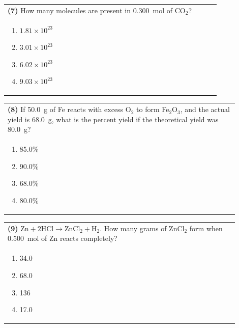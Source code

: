 \documentclass{article}
\begin{document}
{{\vspace{0.2cm}
\noindent\begin{tabular}{|p{0.9\linewidth}|}
\hline
\textbf{(7)} How many molecules are present in 0.300~mol of CO$_2$?\\[0.2cm]

\begin{minipage}[t]{0.85\linewidth}
\begin{enumerate}[label=\alph*.]
\item $1.81\times10^{23}$
\item $3.01\times10^{23}$
\item $6.02\times10^{23}$
\item $9.03\times10^{23}$
\end{enumerate}
\end{minipage}\\[0.2cm]
\hline
\end{tabular}

\vspace{0.2cm}
\noindent\begin{tabular}{|p{0.9\linewidth}|}
\hline
\textbf{(8)} If 50.0~g of Fe reacts with excess O$_2$ to form Fe$_2$O$_3$, and the actual yield is 68.0~g, what is the percent yield if the theoretical yield was 80.0~g?\\[0.2cm]

\begin{minipage}[t]{0.85\linewidth}
\begin{enumerate}[label=\alph*.]
\item 85.0\%
\item 90.0\%
\item 68.0\%
\item 80.0\%
\end{enumerate}
\end{minipage}\\[0.2cm]
\hline
\end{tabular}

\newpage

\noindent\begin{tabular}{|p{0.9\linewidth}|}
\hline
\textbf{(9)} $\text{Zn} + 2\text{HCl} \rightarrow \text{ZnCl}_2 + \text{H}_2$. How many grams of ZnCl$_2$ form when 0.500~mol of Zn reacts completely?\\[0.2cm]

\begin{minipage}[t]{0.85\linewidth}
\begin{enumerate}[label=\alph*.]
\item 34.0
\item 68.0
\item 136
\item 17.0
\end{enumerate}
\end{minipage}\\[0.2cm]
\hline
\end{tabular}

}}
\end{document}
